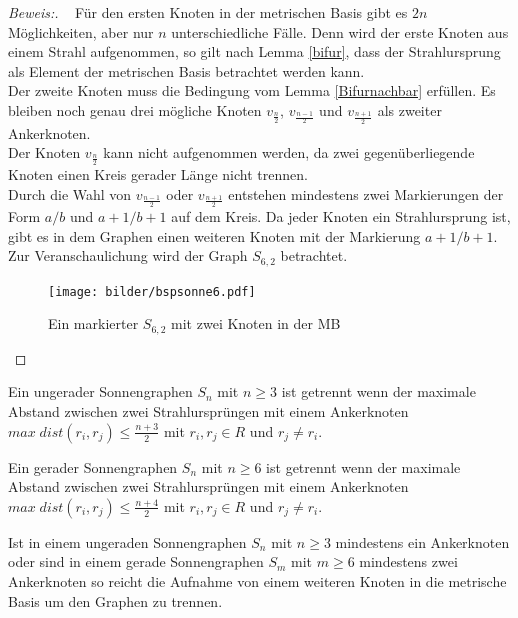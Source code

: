 \begin{proof}[Beweis:]~
Für den ersten Knoten in der metrischen Basis gibt es $2n$ Möglichkeiten, aber nur $n$ unterschiedliche Fälle. Denn wird der erste Knoten aus einem Strahl aufgenommen, so gilt nach Lemma \ref{bifur}, dass der Strahlursprung als Element der metrischen Basis betrachtet werden kann.\\
Der zweite Knoten muss die Bedingung vom Lemma \ref{Bifurnachbar} erfüllen. Es bleiben noch genau drei mögliche Knoten $v_{\frac{n}{2}}$, $v_{\frac{n-1}{2}}$ und $v_{\frac{n+1}{2}}$ als zweiter Ankerknoten.\\ 
Der Knoten $v_{\frac{n}{2}}$ kann nicht aufgenommen werden, da zwei gegenüberliegende Knoten einen Kreis gerader Länge nicht trennen.\\
Durch die Wahl von $v_{\frac{n-1}{2}}$ oder $v_{\frac{n+1}{2}}$ entstehen mindestens zwei Markierungen der Form $a/b$ und $a+1/b+1$ auf dem Kreis. Da jeder Knoten ein Strahlursprung ist, gibt es in dem Graphen einen weiteren Knoten mit der Markierung $a+1/b+1$. Zur Veranschaulichung wird der Graph $S_{6,2}$ betrachtet.
\begin{figure}[h!]
		\centering
 		 \texttt{[image: bilder/bspsonne6.pdf]}
   \caption{Ein markierter $S_{6,2}$ mit zwei Knoten in der MB}
  	 \end{figure}
\end{proof}
\begin{lem}
Ein ungerader Sonnengraphen $S_n$ mit $n\geq 3$ ist getrennt wenn der maximale Abstand zwischen zwei Strahlursprüngen mit einem Ankerknoten $max\;dist(r_i,r_j)\leq \frac{n+3}{2}$ mit $r_i,r_j \in R$ und $r_j\neq r_i$.
\end{lem}

\begin{lem}
Ein gerader Sonnengraphen $S_n$ mit $n\geq 6$ ist getrennt wenn der maximale Abstand zwischen zwei Strahlursprüngen mit einem Ankerknoten $max\;dist(r_i,r_j)\leq \frac{n+4}{2}$ mit $r_i,r_j \in R$ und $r_j\neq r_i$.
\end{lem}
\begin{lem}
Ist in einem ungeraden Sonnengraphen $S_n$ mit $n\geq 3$ mindestens ein Ankerknoten oder sind in einem gerade Sonnengraphen $S_m$ mit $m\geq 6$ mindestens zwei Ankerknoten so reicht die Aufnahme von einem weiteren Knoten in die metrische Basis um den Graphen zu trennen. 
\end{lem}
